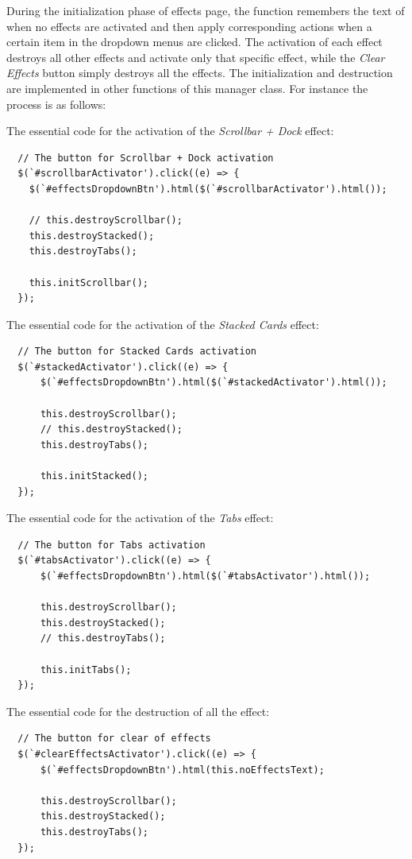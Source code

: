 During the initialization phase of effects page, the function remembers the text of when no effects are activated and then apply corresponding actions when a certain item in the dropdown menus are clicked. The activation of each effect destroys all other effects and activate only that specific effect, while the \emph{Clear Effects} button simply destroys all the effects. The initialization and destruction are implemented in other functions of this manager class. For instance the process is as follows:

The essential code for the activation of the \emph{Scrollbar + Dock} effect:

\begin{verbatim}
  // The button for Scrollbar + Dock activation
  $(`#scrollbarActivator').click((e) => {
    $(`#effectsDropdownBtn').html($(`#scrollbarActivator').html());

    // this.destroyScrollbar();
    this.destroyStacked();
    this.destroyTabs();

    this.initScrollbar();
  });
\end{verbatim}

The essential code for the activation of the \emph{Stacked Cards} effect:

\begin{verbatim}
  // The button for Stacked Cards activation
  $(`#stackedActivator').click((e) => {
      $(`#effectsDropdownBtn').html($(`#stackedActivator').html());

      this.destroyScrollbar();
      // this.destroyStacked();
      this.destroyTabs();

      this.initStacked();
  });
\end{verbatim}

The essential code for the activation of the \emph{Tabs} effect:

\begin{verbatim}
  // The button for Tabs activation
  $(`#tabsActivator').click((e) => {
      $(`#effectsDropdownBtn').html($(`#tabsActivator').html());

      this.destroyScrollbar();
      this.destroyStacked();
      // this.destroyTabs();

      this.initTabs();
  });
\end{verbatim}

The essential code for the destruction of all the effect:

\begin{verbatim}
  // The button for clear of effects
  $(`#clearEffectsActivator').click((e) => {
      $(`#effectsDropdownBtn').html(this.noEffectsText);

      this.destroyScrollbar();
      this.destroyStacked();
      this.destroyTabs();
  });
\end{verbatim}

